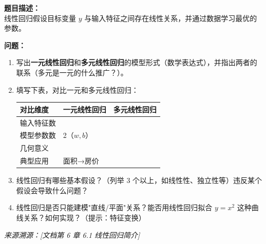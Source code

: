 \documentclass[a4paper,11pt]{ctexart}
\begin{document}
\begin{problembox}
    \textbf{题目描述：}\\
    线性回归假设目标变量 $y$ 与输入特征之间存在线性关系，并通过数据学习最优的参数。

    \vspace{0.3cm}
    \textbf{问题：}
    \begin{enumerate}[(1)]
        \item 写出\textbf{一元线性回归}和\textbf{多元线性回归}的模型形式（数学表达式），并指出两者的联系（多元是一元的什么推广？）。

        \item 填写下表，对比一元和多元线性回归：
        \begin{center}
        \begin{tabular}{p{3cm} p{4.5cm} p{4.5cm}}
            \toprule
            对比维度 & 一元线性回归 & 多元线性回归 \\
            \midrule
            输入特征数 & \underline{\hspace{3.5cm}} & \underline{\hspace{3.5cm}} \\[1.2em]
            模型参数数 & 2（$w, b$） & \underline{\hspace{3.5cm}} \\[1.2em]
            几何意义 & \underline{\hspace{3.5cm}} & \underline{\hspace{3.5cm}} \\[1.2em]
            典型应用 & 面积→房价 & \underline{\hspace{3.5cm}} \\
            \bottomrule
        \end{tabular}
        \end{center}

        \item 线性回归有哪些基本假设？（列举 3 个以上，如线性性、独立性等）违反某个假设会导致什么问题？

        \item 线性回归是否只能建模"直线/平面"关系？能否用线性回归拟合 $y = x^2$ 这种曲线关系？如何实现？（提示：特征变换）
    \end{enumerate}
    {\color{gray}\small\textit{来源溯源：[文档第 6 章 6.1 线性回归简介]}}
\end{problembox}
\end{document}

